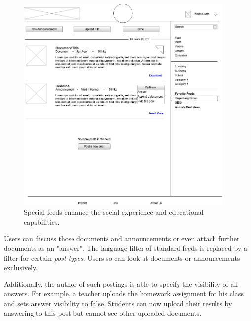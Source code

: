 \documentclass[a4paper, notitlepage, oneside]{article}
\begin{document}
\begin{figure}[htb]
	\centering
	\includegraphics[width=0.95\textwidth]{special}
	\caption{Special feeds enhance the social experience and educational capabilities.}
	\label{fig:special}
\end{figure}
\pagebreak
Users can discuss those documents and announcements or even attach further documents as an "answer". The language filter of standard feeds is replaced by a filter for certain \emph{post types}. Users so can look at documents or announcements exclusively. 

Additionally, the author of such postings is able to specify the visibility of all answers. For example, a teacher uploads the homework assignment for his class and sets answer visibility to false. Students can now upload their results by answering to this post but cannot see other uploaded documents.
\end{document}
